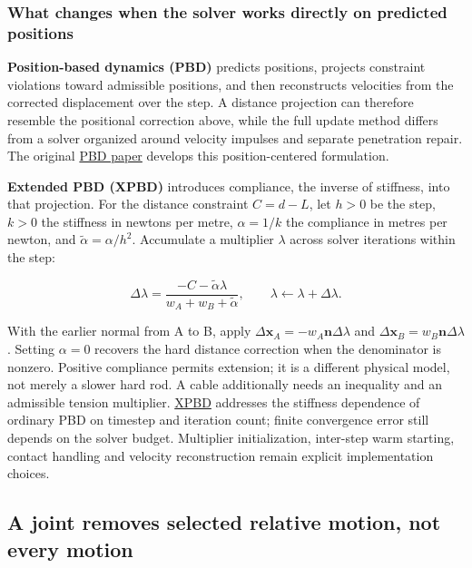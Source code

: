 \subsubsection{What changes when the solver works directly on predicted positions}\label{06-engine-ii-ch033-what-changes-when-the-solver-works-directly-on-predicted-positions}

\textbf{Position-based dynamics (PBD)} predicts positions, projects constraint violations toward admissible positions, and then reconstructs velocities from the corrected displacement over the step. A distance projection can therefore resemble the positional correction above, while the full update method differs from a solver organized around velocity impulses and separate penetration repair. The original \href{https://doi.org/10.2312/PE/vriphys/vriphys06/071-080}{PBD paper} develops this position-centered formulation.

\textbf{Extended PBD (XPBD)} introduces compliance, the inverse of stiffness, into that projection. For the distance constraint \(C=d-L\), let \(h>0\) be the step, \(k>0\) the stiffness in newtons per metre, \(\alpha=1/k\) the compliance in metres per newton, and \(\widetilde\alpha=\alpha/h^2\). Accumulate a multiplier \(\lambda\) across solver iterations within the step:

\[
\Delta\lambda=\frac{-C-\widetilde\alpha\lambda}{w_A+w_B+\widetilde\alpha},\qquad
\lambda\leftarrow\lambda+\Delta\lambda.
\]

With the earlier normal from A to B, apply \(\Delta\mathbf x_A=-w_A\mathbf n\Delta\lambda\) and \(\Delta\mathbf x_B=w_B\mathbf n\Delta\lambda\). Setting \(\alpha=0\) recovers the hard distance correction when the denominator is nonzero. Positive compliance permits extension; it is a different physical model, not merely a slower hard rod. A cable additionally needs an inequality and an admissible tension multiplier. \href{https://mmacklin.com/xpbd.pdf}{XPBD} addresses the stiffness dependence of ordinary PBD on timestep and iteration count; finite convergence error still depends on the solver budget. Multiplier initialization, inter-step warm starting, contact handling and velocity reconstruction remain explicit implementation choices.

\subsection{A joint removes selected relative motion, not every motion}\label{06-engine-ii-ch033-a-joint-removes-selected-relative-motion-not-every-motion}

